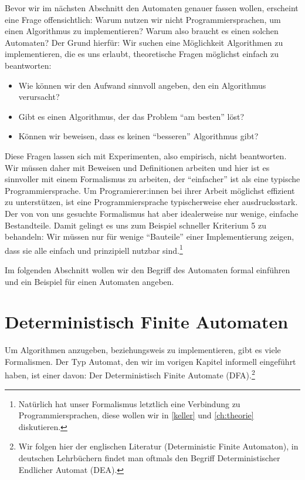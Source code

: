 Bevor wir im nächsten Abschnitt den Automaten genauer fassen wollen,
erscheint eine Frage offensichtlich:
Warum nutzen wir nicht Programmiersprachen, um einen Algorithmus zu implementieren?
Warum also braucht es einen solchen Automaten?
Der Grund hierfür:
Wir suchen eine Möglichkeit Algorithmen zu implementieren,
die es uns erlaubt,
theoretische Fragen möglichst einfach zu beantworten:
\begin{itemize}
    \item Wie können wir den Aufwand sinnvoll angeben, den ein Algorithmus verursacht?
    \item Gibt es einen Algorithmus, der das Problem ``am besten'' löst?
    \item Können wir beweisen, dass es keinen ``besseren'' Algorithmus gibt?
\end{itemize}
Diese Fragen lassen sich mit Experimenten, also empirisch, nicht beantworten.
Wir müssen daher mit Beweisen und Definitionen arbeiten
und hier ist es sinnvoller mit einem Formalismus zu arbeiten,
der ``einfacher'' ist als eine typische Programmiersprache.
Um Programierer:innen bei ihrer Arbeit möglichst effizient zu unterstützen,
ist eine Programmiersprache typischerweise eher ausdrucksstark.
Der von von uns gesuchte Formalismus hat aber idealerweise nur wenige, einfache Bestandteile.
Damit gelingt es uns zum Beispiel schneller Kriterium 5 zu behandeln:
Wir müssen nur für wenige ``Bauteile'' einer Implementierung zeigen,
dass sie alle einfach und prinzipiell nutzbar sind.\footnote{
    Natürlich hat unser Formalismus letztlich eine Verbindung zu Programmiersprachen,
    diese wollen wir in \autoref{keller} und \autoref{ch:theorie} diskutieren.
}

Im folgenden Abschnitt wollen wir den Begriff des Automaten formal einführen
und ein Beispiel für einen Automaten angeben. 

\section{Deterministisch Finite Automaten}

Um Algorithmen anzugeben, beziehungsweis zu implementieren, gibt es viele Formalismen.
Der Typ Automat, den wir im vorigen Kapitel informell eingeführt haben,
ist einer davon:
Der Deterministisch Finite Automate (DFA).\footnote{
    Wir folgen hier der englischen Literatur (Deterministic Finite Automaton),
    in deutschen Lehrbüchern findet man oftmals den Begriff
    Deterministischer Endlicher Automat (DEA).
}

